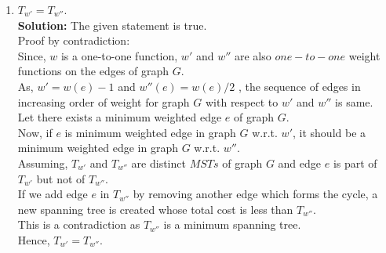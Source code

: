 \documentclass[12pt]{article}
\begin{document}
\begin{enumerate}
\begin{enumerate}
\begin{enumerate}
\item $T_{w'} = T_{w''}$.\\
\textbf{Solution:} The given statement is true.\\
Proof by contradiction:\\
Since, $w$ is a one-to-one function, $w'$ and $w''$ are also $one-to-one$ weight functions on the edges of graph $G$.\\
As, $w' =w(e) - 1$ and $w''(e)=w(e)/2$ , the sequence of edges in increasing order of weight for graph $G$ with respect to $w'$ and $w''$ is same.\\
Let there exists a minimum weighted edge $e$ of graph $G$.\\
Now, if $e$ is minimum weighted edge in graph $G$ w.r.t. $w'$, it should be a minimum weighted edge in graph $G$ w.r.t. $w''$.\\
Assuming, $T_{w'}$ and $T_{w''}$ are distinct $MSTs$ of graph $G$ and edge $e$ is part of $T_{w'}$ but not of $T_{w''}$. \\
If we add edge $e$ in $T_{w''}$ by removing another edge which forms the cycle, a new spanning tree is created whose total cost is less than $T_{w''}$.\\
This is a contradiction as $T_{w''}$ is a minimum spanning tree.\\
Hence, $T_{w'} = T_{w''}$.\\
  

\end{enumerate}
\end{enumerate}
\end{enumerate}
\end{document}
